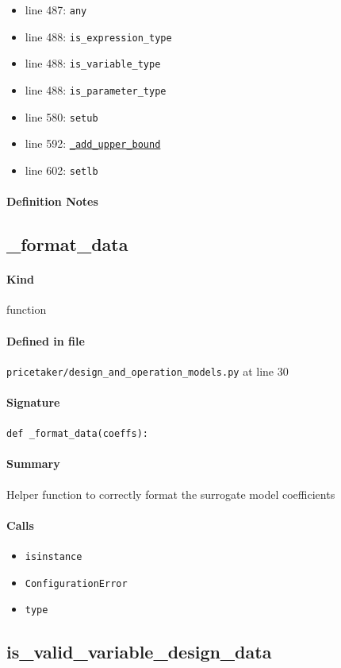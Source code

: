 \documentclass[11pt]{report}
\begin{document}
\begin{itemize}[leftmargin=*]
  \item line 487: \texttt{any}
  \item line 488: \texttt{is\_expression\_type}
  \item line 488: \texttt{is\_variable\_type}
  \item line 488: \texttt{is\_parameter\_type}
  \item line 580: \texttt{setub}
  \item line 592: \hyperref[def:pricetaker-design_and_operation_models.py:StorageModelData.build._add_upper_bound:L575]{\texttt{\_add\_upper\_bound}}
  \item line 602: \texttt{setlb}
\end{itemize}
\paragraph{Definition Notes}
\subsection{\_format\_data}
\label{def:pricetaker-design_and_operation_models.py:_format_data:L30}
\paragraph{Kind} function
\paragraph{Defined in file} \texttt{pricetaker/design\_and\_operation\_models.py} at line 30
\paragraph{Signature} \texttt{def \_format\_data(coeffs):}
\paragraph{Summary} Helper function to correctly format the surrogate model coefficients
\paragraph{Calls}
\begin{itemize}[leftmargin=*]
  \item \texttt{isinstance}
  \item \texttt{ConfigurationError}
  \item \texttt{type}
\end{itemize}
\subsection{is\_valid\_variable\_design\_data}
\label{def:pricetaker-design_and_operation_models.py:is_valid_variable_design_data:L48}
\end{document}
